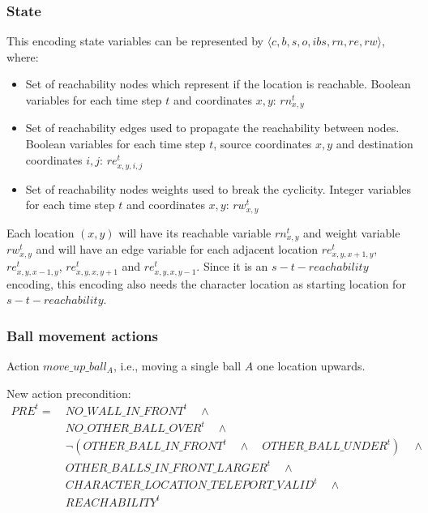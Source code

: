 \documentclass{report}
\theoremstyle{plain}
\begin{document}
\subsubsection{State}
This encoding state variables can be represented by $\langle c, b, s, o, ibs, rn, re, rw\rangle$, where:
\begin{itemize}
\item Set of reachability nodes which represent if the location is reachable. Boolean variables for each time step $t$ and coordinates $x,y$: $rn_{x,y}^t$
\item Set of reachability edges used to propagate the reachability between nodes. Boolean variables for each time step $t$, source coordinates $x,y$ and destination coordinates $i,j$: $re_{x,y,i,j}^t$
\item Set of reachability nodes weights used to break the cyclicity. Integer variables for each time step $t$ and coordinates $x,y$: $rw_{x,y}^t$
\end{itemize}

Each location $(x,y)$ will have its reachable variable $rn_{x,y}^t$ and weight variable $rw_{x,y}^t$ and will have an edge variable for each adjacent location $re_{x, y, x + 1, y}^t$, $re_{x, y, x - 1,y}^t$, $re_{x, y, x, y + 1}^t$ and $re_{x, y, x, y - 1}^t$. Since it is an $s-t-reachability$ encoding, this encoding also needs the character location as starting location for $s-t-reachability$.

\newpage

\subsubsection{Ball movement actions}
Action $move\_up\_ball_A$, i.e., moving a single ball $A$ one location upwards.

New action precondition:
\begin{align*}
PRE^t = \ & NO\_WALL\_IN\_FRONT^t \quad \wedge \\
& NO\_OTHER\_BALL\_OVER^t \quad \wedge \\
& \lnot (OTHER\_BALL\_IN\_FRONT^t \quad \wedge \quad OTHER\_BALL\_UNDER^t) \quad \wedge \\
& OTHER\_BALLS\_IN\_FRONT\_LARGER^t \quad \wedge \\
& CHARACTER\_LOCATION\_TELEPORT\_VALID^t \quad \wedge \\
& REACHABILITY^t
\end{align*}
\end{document}
